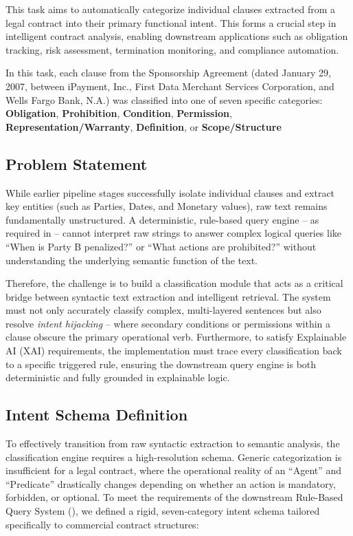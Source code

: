 \documentclass[twoside,final]{hcmut-report}
\newcommand{\result}[1]{\fcolorbox{red}{white}{#1}}
\begin{document}
This task aims to automatically categorize individual clauses extracted from a legal contract into their primary functional intent. This forms a crucial step in intelligent contract analysis, enabling downstream applications such as obligation tracking, risk assessment, termination monitoring, and compliance automation.

In this task, each clause from the Sponsorship Agreement (dated January 29, 2007, between iPayment, Inc., First Data Merchant Services Corporation, and Wells Fargo Bank, N.A.) was classified into one of seven specific categories: \textbf{Obligation}, \textbf{Prohibition}, \textbf{Condition}, \textbf{Permission}, \textbf{Representation/Warranty}, \textbf{Definition}, or \textbf{Scope/Structure}

\subsection*{Problem Statement}
While earlier pipeline stages successfully isolate individual clauses and extract key entities (such as Parties, Dates, and Monetary values), raw text remains fundamentally unstructured. A deterministic, rule-based query engine -- as required in \result{Assignment~\ref{assignment_3}} -- cannot interpret raw strings to answer complex logical queries like ``When is Party B penalized?'' or ``What actions are prohibited?'' without understanding the underlying semantic function of the text.

\medskip

Therefore, the challenge is to build a classification module that acts as a critical bridge between syntactic text extraction and intelligent retrieval. The system must not only accurately classify complex, multi-layered sentences but also resolve \emph{intent hijacking} -- where secondary conditions or permissions within a clause obscure the primary operational verb. Furthermore, to satisfy Explainable AI (XAI) requirements, the implementation must trace every classification back to a specific triggered rule, ensuring the downstream query engine is both deterministic and fully grounded in explainable logic.

\subsection{Intent Schema Definition}
To effectively transition from raw syntactic extraction to semantic analysis, the classification engine requires a high-resolution schema. Generic categorization is insufficient for a legal contract, where the operational reality of an ``Agent'' and ``Predicate'' drastically changes depending on whether an action is mandatory, forbidden, or optional. To meet the requirements of the downstream Rule-Based Query System (\result{Assignment~\ref{assignment_3}}), we defined a rigid, seven-category intent schema tailored specifically to commercial contract structures:
\end{document}
